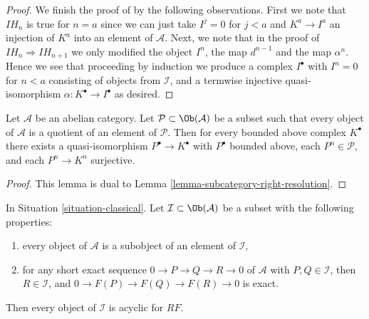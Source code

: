 \begin{proof}
\medskip\noindent
We finish the proof of by the following observations.
First we note that $IH_n$ is true for $n = a$ since
we can just take $I^j = 0$ for $j < a$ and $K^a \to I^a$ an injection
of $K^a$ into an element of $\mathcal{A}$.
Next, we note that in the proof of $IH_n \Rightarrow IH_{n + 1}$
we only modified the object $I^n$, the map $d^{n - 1}$ and
the map $\alpha^n$. Hence we see that proceeding by induction
we produce a complex $I^\bullet$ with $I^n = 0$ for $n < a$
consisting of objects from $\mathcal{I}$, and a termwise
injective quasi-isomorphism $\alpha : K^\bullet \to I^\bullet$ as desired.
\end{proof}

\begin{lemma}
\label{lemma-subcategory-left-resolution}
Let $\mathcal{A}$ be an abelian category.
Let $\mathcal{P} \subset \Ob(\mathcal{A})$ be a subset such
that every object of $\mathcal{A}$ is a quotient of an element of
$\mathcal{P}$. Then for every bounded above complex $K^\bullet$
there exists a quasi-isomorphism $P^\bullet \to K^\bullet$
with $P^\bullet$ bounded above, each $P^n \in \mathcal{P}$, and
each $P^n \to K^n$ surjective.
\end{lemma}

\begin{proof}
This lemma is dual to
Lemma \ref{lemma-subcategory-right-resolution}.
\end{proof}

\begin{lemma}
\label{lemma-subcategory-right-acyclics}
In
Situation \ref{situation-classical}.
Let $\mathcal{I} \subset \Ob(\mathcal{A})$ be a subset with the
following properties:
\begin{enumerate}
\item every object of $\mathcal{A}$ is a subobject of an element of
$\mathcal{I}$,
\item for any short exact sequence $0 \to P \to Q \to R \to 0$ of
$\mathcal{A}$ with $P, Q \in \mathcal{I}$, then $R \in \mathcal{I}$,
and $0 \to F(P) \to F(Q) \to F(R) \to 0$ is exact.
\end{enumerate}
Then every object of $\mathcal{I}$ is acyclic for $RF$.
\end{lemma}

